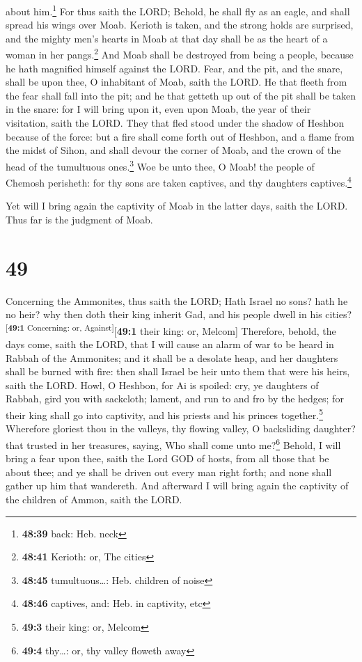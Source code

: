 about him.\footnote{\textbf{48:39} back: Heb. neck}  For
thus saith the LORD; Behold, he shall fly as an eagle, and shall spread
his wings over Moab.  Kerioth is taken, and the strong
holds are surprised, and the mighty men's hearts in Moab at that day
shall be as the heart of a woman in her pangs.\footnote{\textbf{48:41}
  Kerioth: or, The cities}  And Moab shall be destroyed
from being a people, because he hath magnified himself against the LORD.
 Fear, and the pit, and the snare, shall be upon thee, O
inhabitant of Moab, saith the LORD.  He that fleeth from
the fear shall fall into the pit; and he that getteth up out of the pit
shall be taken in the snare: for I will bring upon it, even upon Moab,
the year of their visitation, saith the LORD.  They that
fled stood under the shadow of Heshbon because of the force: but a fire
shall come forth out of Heshbon, and a flame from the midst of Sihon,
and shall devour the corner of Moab, and the crown of the head of the
tumultuous ones.\footnote{\textbf{48:45} tumultuous\ldots: Heb. children
  of noise}  Woe be unto thee, O Moab! the people of
Chemosh perisheth: for thy sons are taken captives, and thy daughters
captives.\footnote{\textbf{48:46} captives, and: Heb. in captivity, etc}

 Yet will I bring again the captivity of Moab in the
latter days, saith the LORD. Thus far is the judgment of Moab.

\hypertarget{section-48}{%
\section{49}\label{section-48}}

 Concerning the Ammonites, thus saith the LORD; Hath
Israel no sons? hath he no heir? why then doth their king inherit Gad,
and his people dwell in his cities?\textsuperscript{{[}\textbf{49:1}
Concerning: or, Against{]}}{[}\textbf{49:1} their king: or, Melcom{]}
 Therefore, behold, the days come, saith the LORD, that I
will cause an alarm of war to be heard in Rabbah of the Ammonites; and
it shall be a desolate heap, and her daughters shall be burned with
fire: then shall Israel be heir unto them that were his heirs, saith the
LORD.  Howl, O Heshbon, for Ai is spoiled: cry, ye
daughters of Rabbah, gird you with sackcloth; lament, and run to and fro
by the hedges; for their king shall go into captivity, and his priests
and his princes together.\footnote{\textbf{49:3} their king: or, Melcom}
 Wherefore gloriest thou in the valleys, thy flowing
valley, O backsliding daughter? that trusted in her treasures, saying,
Who shall come unto me?\footnote{\textbf{49:4} thy\ldots: or, thy valley
  floweth away}  Behold, I will bring a fear upon thee,
saith the Lord GOD of hosts, from all those that be about thee; and ye
shall be driven out every man right forth; and none shall gather up him
that wandereth.  And afterward I will bring again the
captivity of the children of Ammon, saith the LORD.

